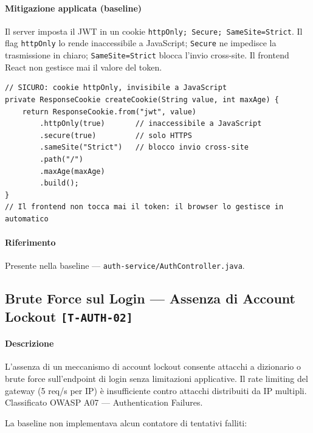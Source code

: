 ﻿\documentclass[a4paper,12pt]{report}
\newcommand{\threat}[1]{\texttt{\small\textcolor{vulnred}{[#1]}}}
\begin{document}
\paragraph{Mitigazione applicata (baseline)}
Il server imposta il JWT in un cookie \texttt{httpOnly; Secure; SameSite=Strict}.
Il flag \texttt{httpOnly} lo rende inaccessibile a JavaScript; \texttt{Secure}
ne impedisce la trasmissione in chiaro; \texttt{SameSite=Strict} blocca l'invio
cross-site. Il frontend React non gestisce mai il valore del token.

\begin{securebox}[title={Codice Sicuro --- AuthController.java (branch \texttt{main})}]
\begin{lstlisting}[style=java]
// SICURO: cookie httpOnly, invisibile a JavaScript
private ResponseCookie createCookie(String value, int maxAge) {
    return ResponseCookie.from("jwt", value)
        .httpOnly(true)       // inaccessibile a JavaScript
        .secure(true)         // solo HTTPS
        .sameSite("Strict")   // blocco invio cross-site
        .path("/")
        .maxAge(maxAge)
        .build();
}
// Il frontend non tocca mai il token: il browser lo gestisce in automatico
\end{lstlisting}
\end{securebox}

\paragraph{Riferimento} Presente nella baseline --- \texttt{auth-service/AuthController.java}.

\subsection{Brute Force sul Login --- Assenza di Account Lockout \threat{T-AUTH-02}}

\paragraph{Descrizione}
L'assenza di un meccanismo di account lockout consente attacchi a dizionario o brute
force sull'endpoint di login senza limitazioni applicative. Il rate limiting del gateway
(5 req/s per IP) è insufficiente contro attacchi distribuiti da IP multipli. Classificato
OWASP A07 --- Authentication Failures.

La baseline non implementava alcun contatore di tentativi falliti:
\end{document}
